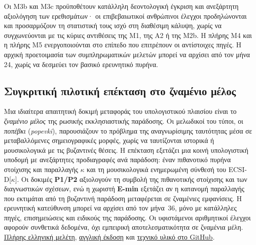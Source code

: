 \documentclass[a4paper]{article}
\begin{document}
Οι Μ3b και Μ3c προϋποθέτουν κατάλληλη δεοντολογική έγκριση και ανεξάρτητη αξιολόγηση των ερεθισμάτων· οι επιβεβαιωτικοί ανθρώπινοι έλεγχοι προδηλώνονται και προσαρμόζουν τη στατιστική τους ισχύ στη διαθέσιμη κάλυψη, χωρίς να συγχωνεύονται με τις κύριες αντιθέσεις της Μ1, της Α2 ή της Μ2b. Η πλήρης Μ4 και η πλήρης Μ5 ενεργοποιούνται στο επίπεδο που επιτρέπουν οι αντίστοιχες πηγές. Η αρχική προετοιμασία των συμπληρωματικών μελετών μπορεί να αρχίσει από τον μήνα 24, χωρίς να δεσμεύει τον βασικό ερευνητικό πυρήνα.



\subsection{Συγκριτική πιλοτική επέκταση στο ζναμένιο μέλος}\label{app:znamenny}
Μια ιδιαίτερα απαιτητική δοκιμή μεταφοράς του υπολογιστικού πλαισίου είναι το \emph{ζναμένιο μέλος} της ρωσικής εκκλησιαστικής παράδοσης. Οι μελωδικοί του τύποι, οι \emph{ποπέβκι} (\emph{popevki}), παρουσιάζουν το πρόβλημα της αναγνωρίσιμης ταυτότητας μέσα σε μεταβαλλόμενες σημειογραφικές μορφές, χωρίς να ταυτίζονται ιστορικά ή μουσικολογικά με τις βυζαντινές θέσεις. Η επέκταση εξετάζει μια κοινή υπολογιστική υποδομή με ανεξάρτητες προδιαγραφές ανά παράδοση: έναν πιθανοτικό πυρήνα στοίχισης και παραλλαγής $\kappa$ και τη μουσικολογικά ενημερωμένη σύνθεσή του ECSI-D[$\kappa$]. Οι δοκιμές \textbf{P1/P2} αξιολογούν τη συμβολή της πιθανοτικής στοίχισης και των διαγνωστικών σχέσεων, ενώ η χωριστή \textbf{E-min} εξετάζει αν η κατανομή παραλλαγής που εκτιμάται από τη βυζαντινή παράδοση μεταφέρεται σε ζναμένιες εμφανίσεις. Η ερευνητική κατεύθυνση μπορεί να αρχίσει από τον μήνα~36, μόνο με κατάλληλες πηγές, επισημειώσεις και ειδικούς της παράδοσης. Οι υφιστάμενοι αριθμητικοί έλεγχοι αφορούν συνθετικά δεδομένα, όχι εμπειρική αποτελεσματικότητα σε ζναμένια μέλη. \href{https://github.com/GeorgeSpy/byz-position-phd-study/blob/main/docs/research/znamenny-transfer/research-appendix.md}{Πλήρης ελληνική μελέτη}, \href{https://github.com/GeorgeSpy/byz-position-phd-study/blob/main/docs/research/znamenny-transfer/research-appendix-en.md}{αγγλική έκδοση} και \href{https://github.com/GeorgeSpy/byz-position-phd-study/tree/main/docs/research/znamenny-transfer}{τεχνικό υλικό στο GitHub}.
\end{document}

